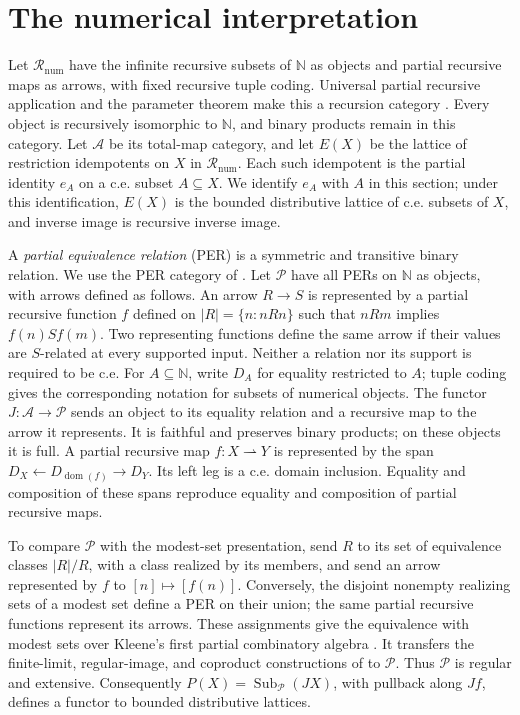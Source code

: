 \documentclass[11pt]{article}
\theoremstyle{definition}
\theoremstyle{remark}
\begin{document}
\section{The numerical interpretation}
\label{sec:integration-numerical}

Let $\mathcal R_{\mathrm{num}}$ have the infinite recursive subsets
of $\mathbb N$ as objects and partial recursive maps as arrows,
with fixed recursive tuple coding. Universal partial recursive
application and the parameter theorem
\cite[Section~3.4.1]{AspertiLongo} make this a recursion
category \cite[Section~10(1)]{Heller}. Every object is recursively
isomorphic to $\mathbb N$, and binary products remain in this
category. Let $\mathcal A$ be its total-map category, and let
$E(X)$ be the lattice of restriction idempotents on $X$ in
$\mathcal R_{\mathrm{num}}$.
Each such idempotent is the partial identity $e_A$ on a c.e.
subset $A\subseteq X$. We identify $e_A$ with $A$ in this section;
under this identification, $E(X)$ is the bounded distributive
lattice of c.e. subsets of $X$, and inverse image is recursive
inverse image.

A \emph{partial equivalence relation} (PER) is a symmetric and
transitive binary relation. We use the PER category of
\cite[Definition~3.4.1.1]{AspertiLongo}. Let $\mathcal P$ have all PERs on
$\mathbb N$ as objects, with arrows defined as follows. An arrow
$R\to S$ is represented by a partial recursive function $f$ defined
on $|R|=\{n:nRn\}$ such that $nRm$ implies $f(n)S f(m)$.
Two representing functions define the same arrow if their values are $S$-related
at every supported input. Neither a relation nor its support is
required to be c.e. For $A\subseteq\mathbb N$, write $D_A$ for
equality restricted to $A$; tuple coding gives the corresponding
notation for subsets of numerical objects. The functor
$J:\mathcal A\to\mathcal P$ sends an object to its equality
relation and a recursive map to the arrow it represents. It is faithful and
preserves binary products; on these objects it is full.
A partial recursive map $f:X\rightharpoonup Y$ is represented
by the span $D_X\leftarrow D_{\operatorname{dom}(f)}\to D_Y$.
Its left leg is a c.e. domain inclusion. Equality and
composition of these spans reproduce equality and composition of
partial recursive maps.

To compare $\mathcal P$ with the modest-set presentation, send $R$
to its set of equivalence classes $|R|/R$, with a class realized
by its members, and send an arrow represented by $f$ to $[n]\mapsto[f(n)]$.
Conversely, the disjoint nonempty realizing sets of a modest set
define a PER on their union; the same partial recursive functions represent its arrows.
These assignments give the equivalence with modest sets over
Kleene's first partial combinatory algebra
\cite[Proposition~1.2.2]{Bauer}. It transfers the finite-limit,
regular-image, and coproduct constructions of
\cite[Sections~1.3.1--1.3.3]{Bauer} to $\mathcal P$.
Thus $\mathcal P$ is regular and extensive.
Consequently $P(X)=\operatorname{Sub}_{\mathcal P}(JX)$, with
pullback along $Jf$, defines a functor to bounded distributive
lattices.
\end{document}
